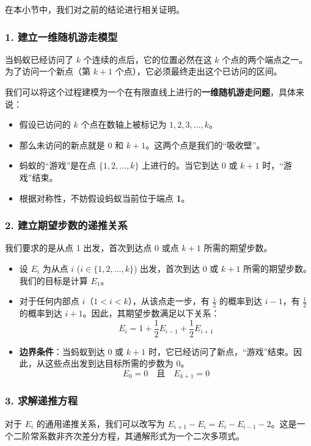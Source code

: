\documentclass[UTF8]{ctexart}
\begin{document}
在本小节中，我们对之前的结论进行相关证明。

\subsubsection*{1. 建立一维随机游走模型}
当蚂蚁已经访问了 $k$ 个连续的点后，它的位置必然在这 $k$ 个点的两个端点之一。为了访问一个新点（第 $k+1$ 个点），它必须最终走出这个已访问的区间。

我们可以将这个过程建模为一个在有限直线上进行的\textbf{一维随机游走问题}，具体来说：
\begin{itemize}
    \item 假设已访问的 $k$ 个点在数轴上被标记为 $1, 2, 3, \dots, k$。
    \item 那么未访问的新点就是 0 和 $k+1$。这两个点是我们的“吸收壁”。
    \item 蚂蚁的“游戏”是在点 $\{1, 2, \dots, k\}$ 上进行的。当它到达 0 或 $k+1$ 时，“游戏”结束。
    \item 根据对称性，不妨假设蚂蚁当前位于端点 \textbf{1}。
\end{itemize}

\subsubsection*{2. 建立期望步数的递推关系}
我们要求的是从点 1 出发，首次到达点 0 或点 $k+1$ 所需的期望步数。
\begin{itemize}
    \item 设 $E_i$ 为从点 $i$ ($i \in \{1, 2, \dots, k\}$) 出发，首次到达 0 或 $k+1$ 所需的期望步数。我们的目标是计算 $E_1$。
    \item 对于任何内部点 $i$（$1 < i < k$），从该点走一步，有 $\frac{1}{2}$ 的概率到达 $i-1$，有 $\frac{1}{2}$ 的概率到达 $i+1$。因此，其期望步数满足以下关系：
    \[
    E_i = 1 + \frac{1}{2}E_{i-1} + \frac{1}{2}E_{i+1}
    \]
    \item \textbf{边界条件}：当蚂蚁到达 0 或 $k+1$ 时，它已经访问了新点，“游戏”结束。因此，从这些点出发到达目标所需的步数为 0。
    \[
    E_0 = 0 \quad \text{且} \quad E_{k+1} = 0
    \]
\end{itemize}

\subsubsection*{3. 求解递推方程}
对于 $E_i$ 的通用递推关系，我们可以改写为 $E_{i+1} - E_i = E_i - E_{i-1} - 2$。这是一个二阶常系数非齐次差分方程，其通解形式为一个二次多项式。
\end{document}
